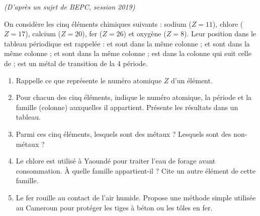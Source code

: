 \documentclass[11pt]{article}
\newcounter{popsec}
\newcounter{popsub}
\newcommand{\courssub}[1]{%
  \stepcounter{popsub}%
  \par\vspace{9pt}\noindent{\popxbold\fontsize{11.5}{13}\selectfont\color{popink}{\color{poporange}\thepopsec.\thepopsub}\hspace{6pt}#1}\par\nopagebreak\vspace{4pt}
}
\begin{document}
\courssub{Je me prépare au Bac}

\begin{exercice}
\textit{(D'après un sujet de BEPC, session 2019)}

On considère les cinq éléments chimiques suivants : sodium  ($Z = 11$), chlore  ($Z = 17$), calcium  ($Z = 20$), fer  ($Z = 26$) et oxygène  ($Z = 8$). Leur position dans le tableau périodique est rappelée :  et  sont dans la même colonne ;  et  sont dans la même colonne ;  et  sont dans la même colonne ;  est dans la colonne qui suit celle de  ;  est un métal de transition de la 4 période.
\begin{enumerate}
\item Rappelle ce que représente le numéro atomique $Z$ d'un élément.
\item Pour chacun des cinq éléments, indique le numéro atomique, la période et la famille (colonne) auxquelles il appartient. Présente les résultats dans un tableau.
\item Parmi ces cinq éléments, lesquels sont des métaux ? Lesquels sont des non-métaux ?
\item Le chlore est utilisé à Yaoundé pour traiter l'eau de forage avant consommation. À quelle famille appartient-il ? Cite un autre élément de cette famille.
\item Le fer rouille au contact de l'air humide. Propose une méthode simple utilisée au Cameroun pour protéger les tiges à béton ou les tôles en fer.
\end{enumerate}
\end{exercice}
\end{document}
